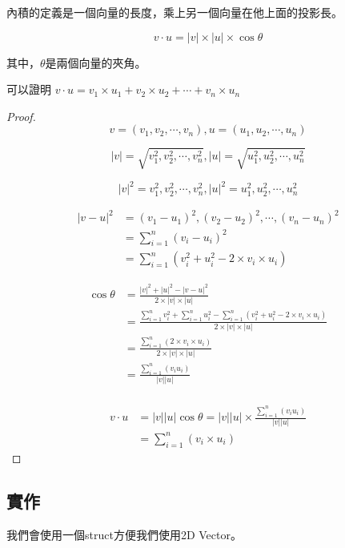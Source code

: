     內積的定義是一個向量的長度，乘上另一個向量在他上面的投影長。

    $$v \cdot u = |v| \times |u| \times \cos \theta$$

    其中，$\theta$是兩個向量的夾角。

    可以證明 $v \cdot u = v_1 \times u_1+v_2 \times u_2+ \cdots +v_n \times u_n$

    \begin{proof}
        $$v=(v_1,v_2, \cdots ,v_n),u=(u_1,u_2, \cdots ,u_n)$$

        $$|v|=\sqrt{v_1^2,v_2^2, \cdots ,v_n^2},|u|=\sqrt{u_1^2,u_2^2, \cdots ,u_n^2}$$
        
        $$|v|^2=v_1^2,v_2^2, \cdots ,v_n^2,|u|^2=u_1^2,u_2^2, \cdots ,u_n^2$$
        
        \begin{align*}
            |v-u|^2 &=(v_1-u_1)^2,(v_2-u_2)^2, \cdots ,(v_n-u_n)^2 \\
            &=\sum_{i=1}^{n} (v_i-u_i)^2 \\ 
            &=\sum_{i=1}^{n} (v_i^2+u_i^2-2\times v_i \times u_i) 
        \end{align*}

        \begin{align*}
            \cos \theta &= \frac{|v|^2+|u|^2-|v-u|^2}
            {2\times |v| \times |u|} \\
            &=\frac{\sum\limits_{i=1}^{n} v_i^2+ \sum\limits_{i=1}^{n} u_i^2- \sum\limits_{i=1}^{n} (v_i^2+u_i^2-2\times v_i \times u_i)}
            {2\times |v| \times |u|} \\
            &=\frac{\sum\limits_{i=1}^{n} (2\times v_i \times u_i)}
            {2\times |v| \times |u|} \\
            &=  \frac{\sum\limits_{i=1}^{n} (v_i u_i)}{|v||u|} \\
        \end{align*}

        \begin{align*}
            v \cdot u &= |v||u|\cos \theta = |v||u| \times \frac{\sum\limits_{i=1}^{n} (v_i u_i)}{|v||u|} \\
            &=\sum_{i=1}^{n} (v_i \times u_i)
        \end{align*}
    \end{proof}

    \subsection{實作}
    我們會使用一個struct方便我們使用2D Vector。

